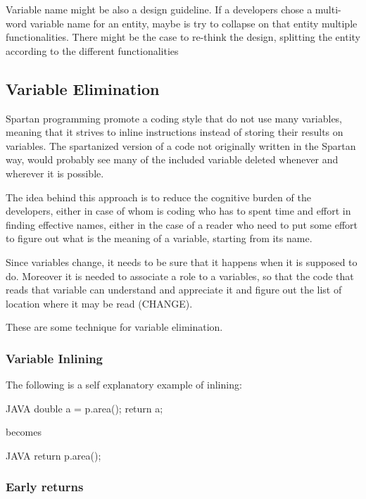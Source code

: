 Variable name might be also a design guideline. If a developers chose a
multi-word variable name for an entity, maybe is try to collapse on that entity
multiple functionalities.  There might be the case to re-think the design,
splitting the entity according to the different functionalities

\subsection{Variable Elimination}

Spartan programming promote a coding style that do not use many variables,
meaning that it strives to inline instructions instead of storing their results
on variables. The spartanized version of a code not originally written in the
Spartan way, would probably see many of the included variable deleted whenever
and wherever it is possible.

The idea behind this approach is to reduce the cognitive burden of the
developers, either in case of whom is coding who has to spent time and effort
in finding effective names, either in the case of a reader who need to put some
effort to figure out what is the meaning of a variable, starting from its name.

Since variables change, it needs to be sure that it happens when it is supposed
to do. Moreover it is needed to associate a role to a variables, so that the
code that reads that variable can understand and appreciate it and figure out
the list of location where it may be read (CHANGE).

These are some technique for variable elimination.

\subsubsection{Variable Inlining}

The following is a self explanatory example of inlining:

\begin{code}{JAVA}
double a = p.area();
return a;
\end{code}

becomes

\begin{code}{JAVA}
return p.area();
\end{code}

\subsubsection{Early returns}

